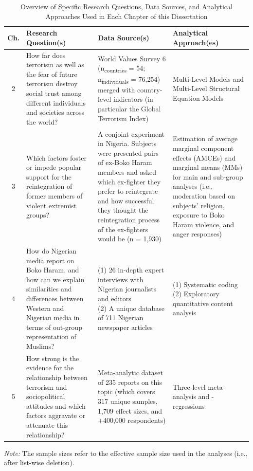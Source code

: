 \begin{table}[H]
\small
\caption{Overview of Specific Research Questions, Data Sources, and Analytical Approaches Used in Each Chapter of this Dissertation} 
\label{tab:intro-tab3}
\renewcommand{\arraystretch}{1.5} %
\begin{tabular}{@{}cp{4cm}p{4cm}p{3.7cm}@{}}
\toprule
\multicolumn{1}{l}{Ch.} & Research Question(s) & Data Source(s) & Analytical Approach(es) \\ \midrule
2 & How far does terrorism as well as the fear of future terrorism destroy social trust among different individuals and societies across the world? & World Values Survey 6 (n\textsubscript{countries} = 54; n\textsubscript{individuals} = 76,254) merged with country-level indicators (in particular the Global Terrorism Index) & Multi-Level Models and Multi-Level Structural Equation Models \\
3 & Which factors foster or impede popular support for the reintegration of former members of violent extremist groups? & A conjoint experiment in Nigeria. Subjects
were presented pairs of ex-Boko Haram members and asked which ex-fighter they prefer to reintegrate and how successful they thought the reintegration process of the ex-fighters would be (n = 1,930) & Estimation of average marginal component effects (AMCEs) and marginal means (MMs) for main and sub-group analyses (i.e., moderation based on subjects' religion, exposure to Boko Haram violence, and anger responses)  \\
4 & How do Nigerian media report on Boko Haram, and how can we explain similarities and differences between Western and Nigerian media in terms of out-group representation of Muslims? &
\parbox[t]{3.5cm}{(1) 26 in-depth expert interviews with Nigerian journalists and editors \\ (2) A unique database of 711 Nigerian newspaper articles} & \parbox[t]{3.5cm}{(1) Systematic coding \\ (2) Exploratory quantitative content analysis} \\
5   & How strong is the evidence for the relationship between terrorism and sociopolitical attitudes and which factors aggravate or attenuate this relationship? & Meta-analytic dataset of 235 reports on this topic (which covers 317 unique samples, 1,709 effect sizes, and +400,000 respondents) &  Three-level meta-analysis and -regressions \\ \bottomrule
\end{tabular}
\vspace{-3mm}
\singlespacing
\footnotesize{\textit{Note:} The sample sizes refer to the effective sample size used in the analyses (i.e., after list-wise deletion).}\par
\end{table}
\clearpage



